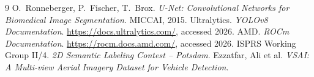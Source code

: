 \documentclass[11pt,a4paper]{article}
\begin{document}
\begin{thebibliography}{9}
    O.~Ronneberger, P.~Fischer, T.~Brox.
    \emph{U-Net: Convolutional Networks for Biomedical Image Segmentation}.
    MICCAI, 2015.
    Ultralytics.
    \emph{YOLOv8 Documentation}.
    \url{https://docs.ultralytics.com/}, accessed 2026.
    AMD.
    \emph{ROCm Documentation}.
    \url{https://rocm.docs.amd.com/}, accessed 2026.
    ISPRS Working Group II/4.
    \emph{2D Semantic Labeling Contest -- Potsdam}.
    Ezzatfar, Ali et al.
    \emph{VSAI: A Multi-view Aerial Imagery Dataset for Vehicle Detection}.
\end{thebibliography}
\end{document}
